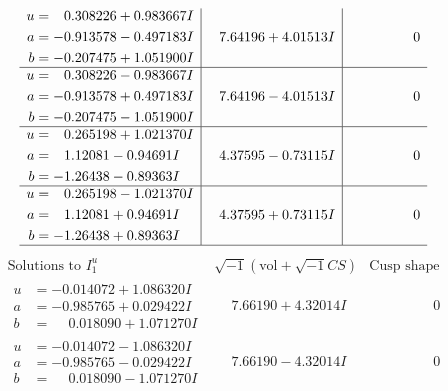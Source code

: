 \documentclass[1p]{elsarticle_modified}
\theoremstyle{definition}
\newcommand{\I}{\sqrt{-1}}
\begin{document}
$$\begin{array}{c|c|c}
\begin{aligned}
u &= \phantom{-}0.308226 + 0.983667 I \\
a &= -0.913578 - 0.497183 I \\
b &= -0.207475 + 1.051900 I\end{aligned}
 & \phantom{-}7.64196 + 4.01513 I & \phantom{-0.000000 } 0 \\ \hline\begin{aligned}
u &= \phantom{-}0.308226 - 0.983667 I \\
a &= -0.913578 + 0.497183 I \\
b &= -0.207475 - 1.051900 I\end{aligned}
 & \phantom{-}7.64196 - 4.01513 I & \phantom{-0.000000 } 0 \\ \hline\begin{aligned}
u &= \phantom{-}0.265198 + 1.021370 I \\
a &= \phantom{-}1.12081 - 0.94691 I \\
b &= -1.26438 - 0.89363 I\end{aligned}
 & \phantom{-}4.37595 - 0.73115 I & \phantom{-0.000000 } 0 \\ \hline\begin{aligned}
u &= \phantom{-}0.265198 - 1.021370 I \\
a &= \phantom{-}1.12081 + 0.94691 I \\
b &= -1.26438 + 0.89363 I\end{aligned}
 & \phantom{-}4.37595 + 0.73115 I & \phantom{-0.000000 } 0\\
 \hline 
 \end{array}$$\newpage$$\begin{array}{c|c|c}  
\text{Solutions to }I^u_{1}& \I (\text{vol} + \sqrt{-1}CS) & \text{Cusp shape}\\
 \hline 
\begin{aligned}
u &= -0.014072 + 1.086320 I \\
a &= -0.985765 + 0.029422 I \\
b &= \phantom{-}0.018090 + 1.071270 I\end{aligned}
 & \phantom{-}7.66190 + 4.32014 I & \phantom{-0.000000 } 0 \\ \hline\begin{aligned}
u &= -0.014072 - 1.086320 I \\
a &= -0.985765 - 0.029422 I \\
b &= \phantom{-}0.018090 - 1.071270 I\end{aligned}
 & \phantom{-}7.66190 - 4.32014 I & \phantom{-0.000000 } 0 \\ \hline\begin{aligned}

\end{aligned}
\end{array}$$
\end{document}
